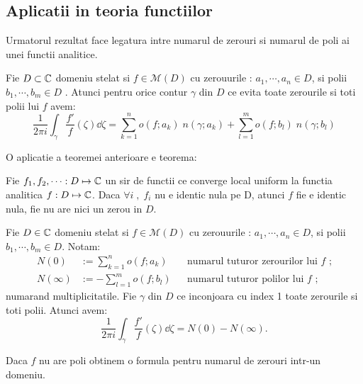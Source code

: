 \subsection{Aplicatii in teoria functiilor}

Urmatorul rezultat face legatura intre numarul de zerouri si numarul de poli ai unei functii analitice.

\begin{theorem}
    Fie $D \subset \mathbb{C}$ domeniu stelat si $f \in \mathcal{M}(D)$ cu zerouurile :
    $a_1, \cdots , a_n \in D$, si polii $b_1, \cdots, b_m \in D$ .
    Atunci pentru orice contur $\gamma$ din $D$ ce evita toate zerourile
    si toti polii lui $f$ avem:
    \[
        \frac{1}{2\pi i} \int_{\gamma} \frac{f'}{f}(\zeta) \dd \zeta
        = \sum_{k=1}^{n} o(f; a_k)\; n(\gamma;a_k)
        + \sum_{l=1}^{m} o(f; b_l)\; n(\gamma;b_l)
    \]
\end{theorem}

O aplicatie a teoremei anterioare e teorema:

\begin{theorem}[Hurwitz]
    Fie $f_1, f_2, \cdots : D \mapsto \mathbb{C}$ un sir de functii ce converge local uniform
    la functia analitica $f : D \mapsto \mathbb{C}$. Daca $\forall i\;,\; f_i $ nu e identic nula pe D,
    atunci $f$ fie e identic nula, fie nu are nici un zerou in $D$.
\end{theorem}

\begin{theorem}
    Fie $D \in \mathbb{C}$ domeniu stelat si $f \in \mathcal{M}(D)$ cu zerouurile :
    $a_1, \cdots , a_n \in D$, si polii $b_1, \cdots, b_m \in D$.
    Notam:
    \begin{align*}
        N(0) &:= \sum_{k=1}^{n} o(f;a_k) && \text{numarul tuturor zerourilor lui } f \text{ ;} \\
        N(\infty) &:= - \sum_{l=1}^{m} o(f;b_l) && \text{numarul tuturor polilor lui } f \text{ ;}
    \end{align*}
    numarand multiplicitatile.  Fie $\gamma$ din $D$ ce inconjoara cu index 1 toate
    zerourile si toti polii. Atunci avem:
    \[
        \frac{1}{2\pi i} \int_{\gamma} \frac{f'}{f} (\zeta) \dd \zeta = N(0) - N(\infty) .
    \]
\end{theorem}

Daca $f$ nu are poli obtinem o formula pentru numarul de zerouri intr-un domeniu.


